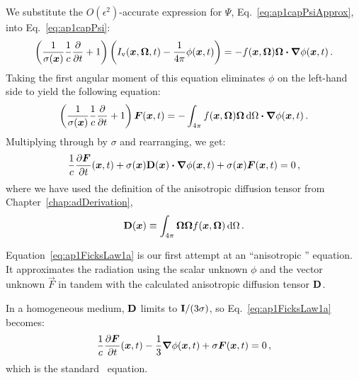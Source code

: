 We substitute the $O(\epsilon^2)$-accurate expression for $\Psi$,
Eq.~\eqref{eq:ap1capPsiApprox}, into Eq.~\eqref{eq:ap1capPsi}:
\begin{equation}\label{eq:ap1Interior1}
  \left( \frac{1}{\sigma(\bm{x})} \frac{1}{c}\frac{\partial }{\partial t} + 1 \right)
  \left( I_\mathrm{v}(\bm{x},\bm{\Omega},t) - \frac{1}{4\pi} \phi(\bm{x},t) \right)
  = - f(\bm{x},\bm{\Omega}) \bm{\Omega}\bm{\cdot} \bm{\nabla} \phi(\bm{x}, t) \,.
\end{equation}
Taking the first angular moment of this equation eliminates $\phi$ on the
left-hand side to yield the following equation:
\begin{equation}\label{eq:ap1FicksLaw1}
  \left( \frac{1}{\sigma(\bm{x})} \frac{1}{c}\frac{\partial }{\partial t} + 1 \right)
  \bm{F}(\bm{x},t) 
  = - \int_{4\pi} f(\bm{x},\bm{\Omega}) \bm{\Omega} \mathop{}\!\mathrm{d}\Omega
  \bm{\cdot} \bm{\nabla} \phi(\bm{x}, t) \,.
\end{equation}
Multiplying through by $\sigma$ and rearranging, we get:
\begin{equation}\label{eq:ap1FicksLaw1a}
  \frac{1}{c}\frac{\partial \bm{F}}{\partial t}(\bm{x},t)
  + \sigma(\bm{x}) \mathbf{D}(\bm{x}) \bm{\cdot} \bm{\nabla} \phi(\bm{x}, t) 
  + \sigma(\bm{x})\bm{F}(\bm{x},t) 
  = 0 \,,
\end{equation}
where we have used the definition of the anisotropic diffusion tensor from
Chapter~\ref{chap:adDerivation},
\begin{equation}\label{eq:dDefinition_4}
  \mathbf{D}(\bm{x}) \equiv \int_{4\pi} \bm{\Omega} \bm{\Omega}
  f(\bm{x}, \bm{\Omega}) \mathop{}\!\mathrm{d}\Omega \,.
\end{equation}

Equation~\eqref{eq:ap1FicksLaw1a} is our first attempt at an ``anisotropic
\Pone'' equation. It approximates the radiation using the scalar unknown $\phi$
and the vector unknown $\vec{F}$ in tandem with the calculated anisotropic
diffusion tensor $\mathbf{D}$.

In a homogeneous medium, $\mathbf{D}$ limits to $\mathbf{I}/(3\sigma)$, so
Eq.~\eqref{eq:ap1FicksLaw1a} becomes:
\begin{equation*}
  \frac{1}{c}\frac{\partial \bm{F}}{\partial t}(\bm{x},t) - \frac{1}{3} \bm{\nabla}\phi(\bm{x}, t)
  + \sigma\bm{F}(\bm{x},t) 
  = 0\,,
\end{equation*}
which is the standard \Pone\ equation.


